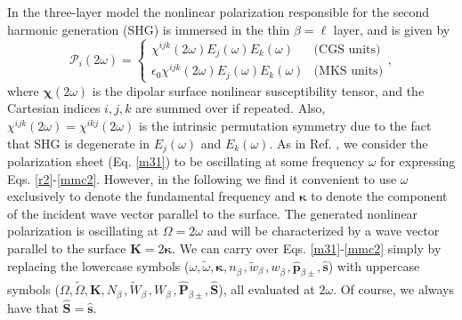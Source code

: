 In the three-layer model the nonlinear polarization responsible for the second
harmonic generation (SHG) is immersed in the thin $\beta=\ell$ layer, and is
given by
\begin{equation}\label{tres}
\mathcal{P}_{i}(2\omega)=
\left\{
\begin{array}{cc}
\chi^{ijk}(2\omega)E_{j}(\omega)E_{k}(\omega)             & \text{(CGS units)}\\
\epsilon_{0}\chi^{ijk}(2\omega)E_{j}(\omega)E_{k}(\omega) & \text{(MKS units)}
\end{array}
\right.,
\end{equation}
where $\boldsymbol{\chi}(2\omega)$ is the dipolar surface nonlinear
susceptibility tensor, and the Cartesian indices $i,j,k$ are summed over if
repeated. Also, $\chi^{ijk}(2\omega) = \chi^{ikj}(2\omega)$ is the intrinsic
permutation symmetry due to the fact that SHG is degenerate in $E_{j}(\omega)$
and $E_{k}(\omega)$. As in Ref. \cite{mizrahiJOSA88}, we consider the
polarization sheet (Eq. \eqref{m31}) to be oscillating at some frequency
$\omega$ for expressing Eqs. \eqref{r2}-\eqref{mmc2}. However, in the following
we find it convenient to use $\omega$ exclusively to denote the fundamental
frequency and $\boldsymbol{\kappa}$ to denote the component of the incident wave
vector parallel to the surface. The generated nonlinear polarization is
oscillating at $\Omega = 2\omega$ and will be characterized by a wave vector
parallel to the surface $\mathbf{K} = 2\boldsymbol{\kappa}$. We can carry over
Eqs. \eqref{m31}-\eqref{mmc2} simply by replacing the lowercase symbols
($\omega,\tilde{\omega},\boldsymbol{\kappa},n^{\phantom{A}}_{\beta},
\tilde{w}^{\phantom{A}}_{\beta},w^{\phantom{A}}_{\beta},
\hat{\mathbf{p}}_{\beta\pm},\hat{\mathbf{s}}$) with uppercase symbols 
($\Omega,\tilde{\Omega},\mathbf{K},N^{\phantom{A}}_{\beta},
\tilde{W}^{\phantom{A}}_{\beta},W^{\phantom{A}}_{\beta},
\hat{\mathbf{P}}_{\beta\pm},\hat{\mathbf{S}}$), all evaluated at $2\omega$. 
Of course, we always have that $\hat{\mathbf{S}}=\hat{\mathbf{s}}$.

